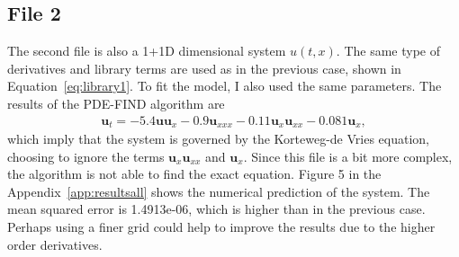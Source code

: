 \documentclass[unicode,11pt,a4paper,oneside,numbers=endperiod,openany]{scrartcl}
\begin{document}
\subsection*{File 2}
The second file is also a 1+1D dimensional system $u(t, x)$. The same
type of derivatives and library terms are used as in the previous case, shown in
Equation~\eqref{eq:library1}.
To fit the model, I also used the same parameters.
The results of the PDE-FIND algorithm are
\begin{align}
    \mathbf{u}_t = -5.4 \mathbf{u} \mathbf{u}_x - 0.9 \mathbf{u}_{xxx} - 0.11 \mathbf{u}_x \mathbf{u}_{xx} - 0.081 \mathbf{u}_x,
\end{align}
which imply that the system is governed by the
Korteweg-de Vries equation, choosing to ignore the terms $\mathbf{u}_x \mathbf{u}_{xx}$ and
$\mathbf{u}_x$. Since this file is a bit more complex, the algorithm is not able
to find the exact equation. 
Figure 5 in the Appendix~\ref{app:resultsall} shows the numerical prediction of the system.
The mean squared error is 1.4913e-06, which is higher than in the previous case.
Perhaps using a finer grid could help to improve the
results due to the higher order derivatives.
\end{document}

